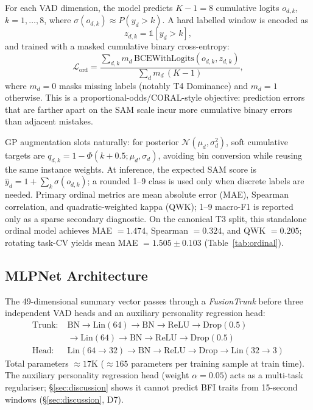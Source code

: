 \documentclass[sigconf,review,anonymous]{acmart}
\begin{document}
For each VAD dimension, the model predicts $K-1=8$ cumulative logits
$o_{d,k}$, $k=1,\ldots,8$, where
$\sigma(o_{d,k}) \approx P(y_d > k)$.  A hard labelled window is encoded as
\begin{equation}
  z_{d,k} = \mathbb{1}[y_d > k],
\end{equation}
and trained with a masked cumulative binary cross-entropy:
\begin{equation}
  \mathcal{L}_{\text{ord}} =
  \frac{\sum_{d,k} m_d\,\mathrm{BCEWithLogits}(o_{d,k}, z_{d,k})}
       {\sum_d m_d\,(K-1)} ,
\end{equation}
where $m_d=0$ masks missing labels (notably T4 Dominance) and $m_d=1$
otherwise.  This is a proportional-odds/CORAL-style objective: prediction
errors that are farther apart on the SAM scale incur more cumulative binary
errors than adjacent mistakes.

GP augmentation slots naturally: for posterior $\mathcal{N}(\mu_d,\sigma_d^2)$,
soft cumulative targets are $q_{d,k} = 1-\Phi(k+0.5;\mu_d,\sigma_d)$, avoiding
bin conversion while reusing the same instance weights.
At inference, the expected SAM score is $\hat{y}_d = 1 + \sum_k \sigma(o_{d,k})$;
a rounded 1--9 class is used only when discrete labels are needed.
Primary ordinal metrics are mean absolute error (MAE), Spearman correlation,
and quadratic-weighted kappa (QWK); 1--9 macro-F1 is reported only as a sparse
secondary diagnostic.  On the canonical T3 split, this standalone ordinal model
achieves MAE $=1.474$, Spearman $=0.324$, and QWK $=0.205$; rotating task-CV
yields mean MAE $=1.505 \pm 0.103$ (Table~\ref{tab:ordinal}).

\subsection{MLPNet Architecture}
\label{sec:mlp}

The 49-dimensional summary vector passes through a \emph{FusionTrunk}
before three independent VAD heads and an auxiliary personality regression
head:
\begin{align*}
  \text{Trunk:} \; &\text{BN}{\to}\text{Lin}(64){\to}\text{BN}{\to}
    \text{ReLU}{\to}\text{Drop}(0.5) \\
                 &{\to}\text{Lin}(64){\to}\text{BN}{\to}\text{ReLU}{\to}
    \text{Drop}(0.5) \\
  \text{Head:} \; &\text{Lin}(64{\to}32){\to}\text{BN}{\to}
    \text{ReLU}{\to}\text{Drop}{\to}\text{Lin}(32{\to}3)
\end{align*}
Total parameters $\approx 17$K ($\approx 165$ parameters per training
sample at train time).
The auxiliary personality regression head (weight $\alpha = 0.05$) acts
as a multi-task regulariser; \S\ref{sec:discussion} shows it cannot
predict BFI traits from 15-second windows (\S\ref{sec:discussion}, D7).
\end{document}

